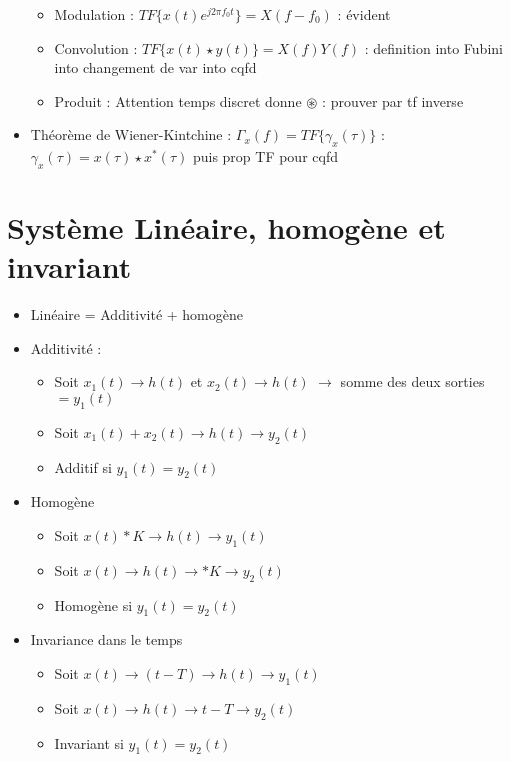 \documentclass{article}
\begin{document}
\begin{multicols}{2}
\begin{itemize}
\begin{itemize}
            \item Modulation : $  TF \{x(t) e^{j 2 \pi f_0 t}\} = X(f - f_0) $ : évident 
            \item Convolution : $ TF\{x(t) \star y(t)\} =X(f)Y(f) $ : definition into Fubini into changement de var into cqfd
            \item Produit : Attention temps discret donne $ \circledast  $ : prouver par tf inverse 
        \end{itemize}
        \item Théorème de Wiener-Kintchine : $ \Gamma _x(f) = TF\{\gamma _x(\tau )\} $ : $ \gamma _x (\tau ) = x(\tau )\star x^*(\tau ) $ puis prop TF pour cqfd
    \end{itemize}
    
    \section{Système Linéaire, homogène et invariant}
    \begin{itemize}
        \item Linéaire = Additivité + homogène 
        \item Additivité : \begin{itemize}
            \item Soit $ x_1(t) \to h(t) $ et $ x_2(t) \to h(t) $ $\rightarrow$ somme des deux sorties $ = y_1(t) $
            \item Soit $ x_1(t)+x_2(t) \to h(t) \to y_2(t) $
            \item Additif si $ y_1(t) = y_2(t) $  
        \end{itemize} 
        \item Homogène \begin{itemize}
            \item Soit $ x(t)*K \to h(t) \to y_1(t)$ 
            \item Soit $ x(t) \to h(t) \to *K \to y_2(t)$
            \item Homogène si $ y_1(t) = y_2(t) $
        \end{itemize}
        \item Invariance dans le temps \begin{itemize}
            \item Soit $ x(t) \to (t-T) \to h(t) \to y_1(t) $ 
            \item Soit $ x(t) \to h(t) \to t-T \to y_2(t) $ 
            \item Invariant si $ y_1(t) = y_2(t) $
        \end{itemize}
    \end{itemize}
    

\end{multicols}
\end{document}
